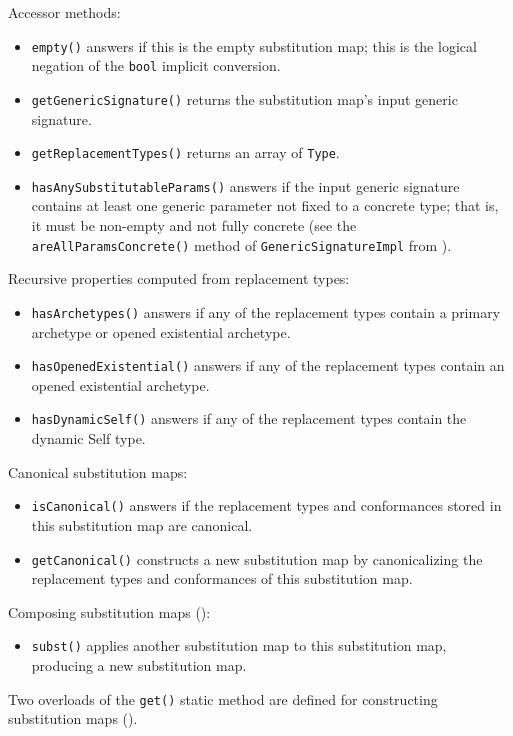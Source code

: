 \documentclass[../generics]{subfiles}
\begin{document}
Accessor methods:
\begin{itemize}
\item \texttt{empty()} answers if this is the empty substitution map; this is the logical negation of the \texttt{bool} implicit conversion.
\item \texttt{getGenericSignature()} returns the substitution map's input generic signature.
\item \texttt{getReplacementTypes()} returns an array of \texttt{Type}.
\item \texttt{hasAnySubstitutableParams()} answers if the input generic signature contains at least one generic parameter not fixed to a concrete type; that is, it must be non-empty and not fully concrete (see the \texttt{areAllParamsConcrete()} method of \texttt{GenericSignatureImpl} from ).
\end{itemize}
Recursive properties computed from replacement types:
\begin{itemize}
\item \texttt{hasArchetypes()} answers if any of the replacement types contain a primary archetype or opened existential archetype.
\item \texttt{hasOpenedExistential()} answers if any of the replacement types contain an opened existential archetype.
\item \texttt{hasDynamicSelf()} answers if any of the replacement types contain the dynamic Self type.
\end{itemize}
Canonical substitution maps:
\begin{itemize}
\item \texttt{isCanonical()} answers if the replacement types and conformances stored in this substitution map are canonical.
\item \texttt{getCanonical()} constructs a new substitution map by canonicalizing the replacement types and conformances of this substitution map.
\end{itemize}
Composing substitution maps ():
\begin{itemize}
\item \texttt{subst()} applies another substitution map to this substitution map, producing a new substitution map.
\end{itemize}
Two overloads of the \texttt{get()} static method are defined for constructing substitution maps ().
\end{document}
